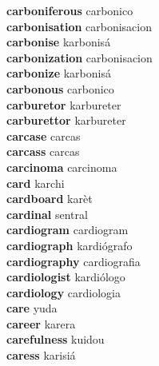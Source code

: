 \textbf{carboniferous } carbonico \\
\textbf{carbonisation } carbonisacion \\
\textbf{carbonise } karbonisá \\
\textbf{carbonization } carbonisacion \\
\textbf{carbonize } karbonisá \\
\textbf{carbonous } carbonico \\
\textbf{carburetor } karbureter \\
\textbf{carburettor } karbureter \\
\textbf{carcase } carcas \\
\textbf{carcass } carcas \\
\textbf{carcinoma } carcinoma \\
\textbf{card } karchi \\
\textbf{cardboard } karèt \\
\textbf{cardinal } sentral \\
\textbf{cardiogram } cardiogram \\
\textbf{cardiograph } kardiógrafo \\
\textbf{cardiography } cardiografia \\
\textbf{cardiologist } kardiólogo \\
\textbf{cardiology } cardiologia \\
\textbf{care } yuda \\
\textbf{career } karera \\
\textbf{carefulness } kuidou \\
\textbf{caress } karisiá \\
